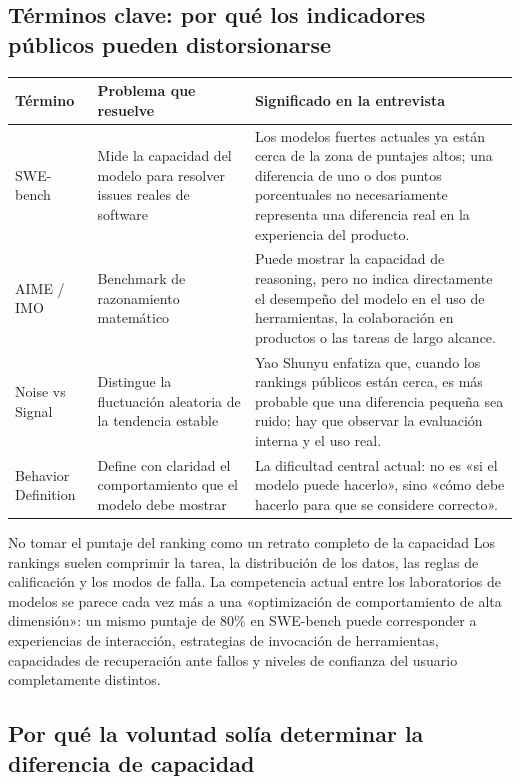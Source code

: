\subsection{Términos clave: por qué los indicadores públicos pueden distorsionarse}

\noindent\begin{tabularx}{\textwidth}{p{}p{}X}
\toprule
Término & Problema que resuelve & Significado en la entrevista \\
\midrule
SWE-bench & Mide la capacidad del modelo para resolver issues reales de software & Los modelos fuertes actuales ya están cerca de la zona de puntajes altos; una diferencia de uno o dos puntos porcentuales no necesariamente representa una diferencia real en la experiencia del producto. \\
AIME / IMO & Benchmark de razonamiento matemático & Puede mostrar la capacidad de reasoning, pero no indica directamente el desempeño del modelo en el uso de herramientas, la colaboración en productos o las tareas de largo alcance. \\
Noise vs Signal & Distingue la fluctuación aleatoria de la tendencia estable & Yao Shunyu enfatiza que, cuando los rankings públicos están cerca, es más probable que una diferencia pequeña sea ruido; hay que observar la evaluación interna y el uso real. \\
Behavior Definition & Define con claridad el comportamiento que el modelo debe mostrar & La dificultad central actual: no es «si el modelo puede hacerlo», sino «cómo debe hacerlo para que se considere correcto». \\
\bottomrule
\end{tabularx}

\begin{warningbox}{No tomar el puntaje del ranking como un retrato completo de la capacidad}
Los rankings suelen comprimir la tarea, la distribución de los datos, las reglas de calificación y los modos de falla. La competencia actual entre los laboratorios de modelos se parece cada vez más a una «optimización de comportamiento de alta dimensión»: un mismo puntaje de 80\% en SWE-bench puede corresponder a experiencias de interacción, estrategias de invocación de herramientas, capacidades de recuperación ante fallos y niveles de confianza del usuario completamente distintos.
\end{warningbox}

\subsection{Por qué la voluntad solía determinar la diferencia de capacidad}

